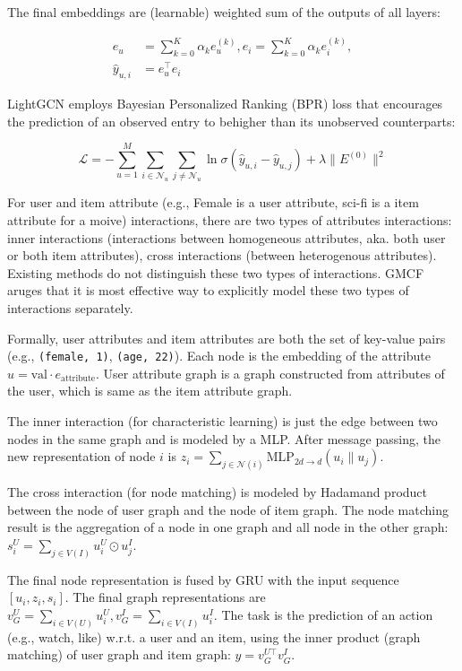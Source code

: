 The final embeddings are (learnable) weighted sum of the outputs of all layers:

\begin{align}
	e_u &= \sum_{k=0}^K \alpha_k e_u^{(k)}, e_i = \sum_{k=0}^K \alpha_k e_i^{(k)}, \\
	\hat{y}_{u,i} &= e_u^\top e_i
\end{align}

LightGCN employs Bayesian Personalized Ranking (BPR) loss that encourages the prediction of an observed entry to behigher than its unobserved counterparts:

\begin{equation}
	\mathcal{L} = - \sum_{u=1}^M \sum_{i \in \mathcal{N}_u} \sum_{j \ne \mathcal{N}_u} \ln \sigma (\hat{y}_{u,i} - \hat{y}_{u,j}) + \lambda \lVert E^{(0)} \rVert^2
\end{equation}

For user and item attribute (e.g., Female is a user attribute, sci-fi is a item attribute for a moive) interactions, there are two types of attributes interactions: inner interactions (interactions between homogeneous attributes, aka. both user or both item attributes), cross interactions (between heterogenous attributes).
Existing methods do not distinguish these two types of interactions.
GMCF~ aruges that it is most effective way to explicitly model these two types of interactions separately.

Formally, user attributes and item attributes are both the set of key-value pairs (e.g., \texttt{(female, 1)}, \texttt{(age, 22)}).
Each node is the embedding of the attribute $u = \text{val} \cdot e_{\text{attribute}}$.
User attribute graph is a  graph constructed from attributes of the user, which is same as the item attribute graph.

The inner interaction (for characteristic learning) is just the edge between two nodes in the same graph and is modeled by a MLP.
After message passing, the new representation of node $i$ is $z_i = \sum_{j \in \mathcal{N}(i)} \text{MLP}_{2d \rightarrow d} (u_i \parallel u_j)$.

The cross interaction (for node matching) is modeled by Hadamand product between the node of user graph and the node of item graph.
The node matching result is the aggregation of a node in one graph and all node in the other graph: $s_i^U = \sum_{j \in V(I)} u_i^U \odot u_j^I$.

The final node representation is fused by GRU with the input sequence $[u_i, z_i, s_i]$.
The final graph representations are $v_G^U = \sum_{i \in V(U)} u_i^U, v_G^I = \sum_{i \in V(I)} u_i^I$.
The task is the prediction of an action (e.g., watch, like) w.r.t. a user and an item, using the inner product (graph matching) of user graph and item graph: $\hat{y} = v_G^{U \top} v_G^I$.

